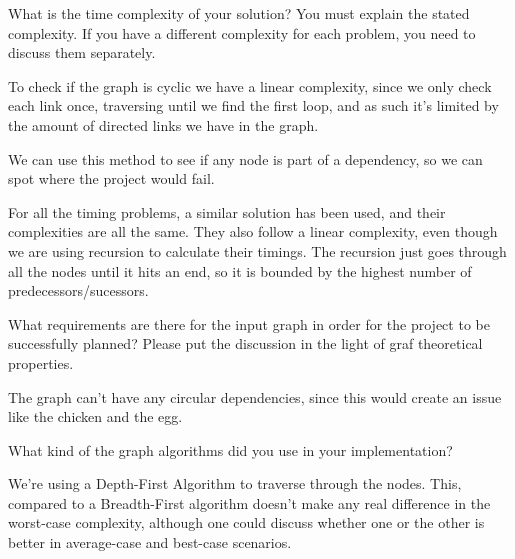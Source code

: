 \documentclass{../../../myassignment}
\begin{document}
	\begin{problem}
		What is the time complexity of your solution? You must explain the stated complexity. If you have a different complexity for each problem, you need to discuss them separately.

	\end{problem}

	\begin{answer}
		To check if the graph is cyclic we have a linear complexity, since we only check each link once, traversing until we find the first loop, and as such it's limited by the amount of directed links we have in the graph.

		We can use this method to see if any node is part of a dependency, so we can spot where the project would fail.

		For all the timing problems, a similar solution has been used, and their complexities are all the same. They also follow a linear complexity, even though we are using recursion to calculate their timings. The recursion just goes through all the nodes until it hits an end, so it is bounded by the highest number of predecessors/sucessors.

	\end{answer}

	\begin{problem}
		What requirements are there for the input graph in order for the project to be successfully planned? Please put the discussion in the light of graf theoretical properties.
	\end{problem}

	\begin{answer}
		The graph can't have any circular dependencies, since this would create an issue like the chicken and the egg.

	\end{answer}

	\begin{problem}
		What kind of the graph algorithms did you use in your implementation?
	\end{problem}

	\begin{answer} 
		We're using a Depth-First Algorithm to traverse through the nodes. This, compared to a Breadth-First algorithm doesn't make any real difference in the worst-case complexity, although one could discuss whether one or the other is better in average-case and best-case scenarios.

	\end{answer}
\end{document}
